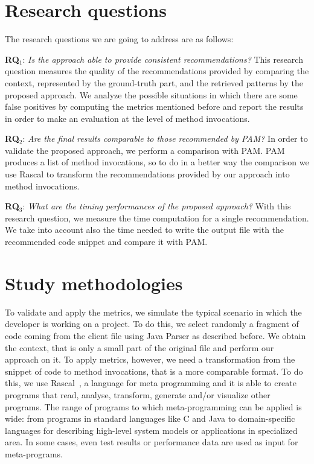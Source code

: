 \section{Research questions}

The research questions we are going to address are as follows:

\noindent\textbf{RQ$_1$}: \textit{ Is the approach able to provide consistent recommendations?} This research question measures the quality of the recommendations provided by comparing the context, represented by the ground-truth part, and the retrieved patterns by the proposed approach. We analyze the possible situations in which there are some false positives by computing the metrics mentioned before and report the results in order to make an evaluation at the level of method invocations.

\noindent\textbf{RQ$_2$}: \textit{Are the final results comparable to those recommended by PAM?} In order to validate the proposed approach, we perform a comparison with PAM. PAM produces a list of method invocations, so to do in a better way the comparison we use Rascal to transform the recommendations provided by our approach into method invocations.

\noindent\textbf{RQ$_3$}: \textit{What are the timing performances of the proposed approach?} With this research question, we measure the time computation for a single recommendation. We take into account also the time needed to write the output file with the recommended code snippet and compare it with PAM. %


\section{Study methodologies}

To validate and apply the metrics, we simulate the typical scenario in which the developer is working on a project. To do this, we select randomly a fragment of code coming from the client file using Java Parser as described before. We obtain the context, that is only a small part of the original file and perform our approach on it. To apply metrics, however, we need a transformation from the snippet of code to method invocations, that is a more comparable format. To do this, we use Rascal~\cite{utor.rascal-mpl.org/_last_nodate}, a language for meta programming and it is able to create programs that read, analyse, transform, generate and/or visualize other programs. The range of programs to which meta-programming can be applied is wide: from programs in standard languages like C and Java to domain-specific languages for describing high-level system models or applications in specialized area. In some cases, even test results or performance data are used as input for meta-programs. 

